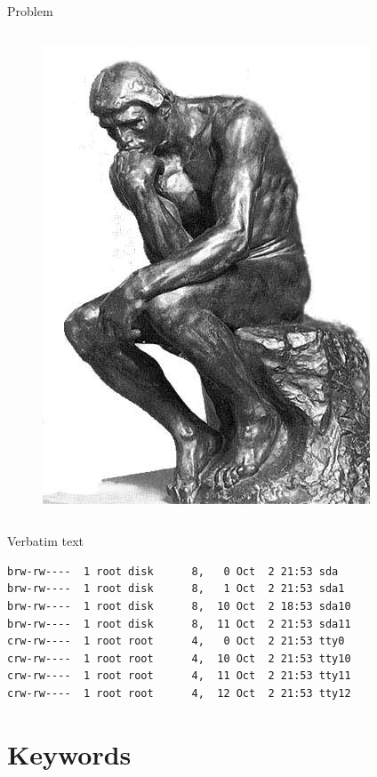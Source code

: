\documentclass{soa.cs.pub.ro}
\begin{document}
\begin{frame}{Problem}
\begin{columns}
\begin{column}[l]{0.45\textwidth}
\begin{figure}
         \includegraphics[scale=0.25]{img/thinker.jpg}
      \end{figure}
    \end{column}
  \end{columns}
\end{frame}

\begin{frame}[fragile]{Verbatim text}
  \pause
  \footnotesize
  \begin{verbatim}
brw-rw----  1 root disk      8,   0 Oct  2 21:53 sda
brw-rw----  1 root disk      8,   1 Oct  2 21:53 sda1
brw-rw----  1 root disk      8,  10 Oct  2 18:53 sda10
brw-rw----  1 root disk      8,  11 Oct  2 21:53 sda11
crw-rw----  1 root root      4,   0 Oct  2 21:53 tty0
crw-rw----  1 root root      4,  10 Oct  2 21:53 tty10
crw-rw----  1 root root      4,  11 Oct  2 21:53 tty11
crw-rw----  1 root root      4,  12 Oct  2 21:53 tty12
  \end{verbatim}
\end{frame}

\section{Keywords}
\end{document}
